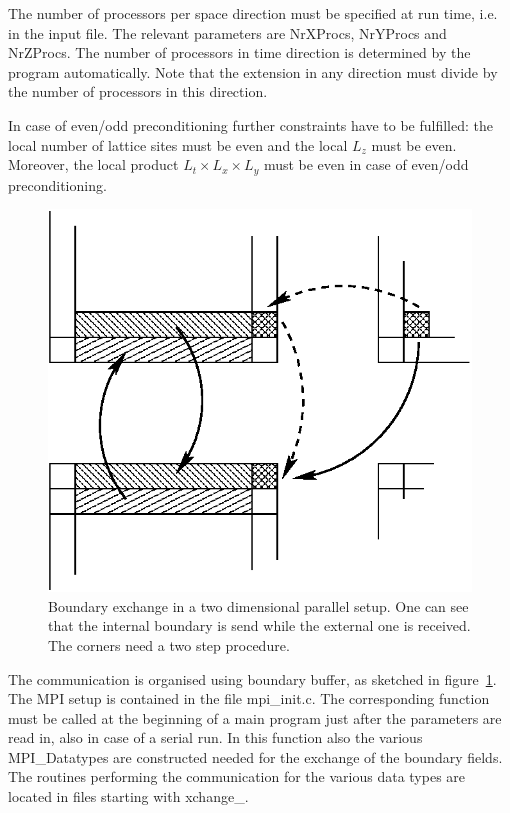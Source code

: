 The number of processors per space direction must be specified at run time,
i.e. in the input file. The relevant parameters are {\ttfamily
  NrXProcs}, {\ttfamily NrYProcs} and {\ttfamily NrZProcs}. The number
of processors in time direction is determined by the program
automatically. Note that the extension in any direction must divide by
the number of processors in this direction. 

In case of even/odd preconditioning further constraints have to be
fulfilled: the local number of lattice sites must be even and the
local $L_z$ must be even. Moreover, the local product $L_t\times L_x
\times L_y$ must be even in case of even/odd preconditioning. 


\begin{figure}[htbp]
\centering
\includegraphics[width=0.65\linewidth]{partition}
\caption{Boundary exchange in a two dimensional parallel setup. One
  can see that the internal boundary is send while the external one
  is received. The corners need a two step procedure.}
\label{fig:partition}
\end{figure}

The communication is organised using boundary buffer, as sketched in
figure~\ref{fig:partition}. 
%
The MPI setup is contained in the file {\ttfamily mpi\_init.c}. The
corresponding function must be called at the beginning of a main
program just after the parameters are read in, also in case of a
serial run. In this function also 
the various {\ttfamily MPI\_Datatype}s are constructed needed for the
exchange of the boundary fields. The routines performing the
communication for the various data types are located in files starting
with {\ttfamily xchange\_}.

